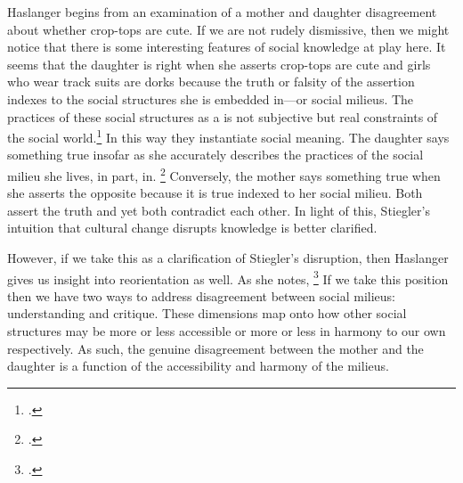\documentclass[letterpaper,notitlepage,12pt]{article}
\begin{document}
Haslanger begins from an examination of a mother and daughter disagreement about
whether crop-tops are cute.
If we are not rudely dismissive, then we might notice that there is some
interesting features of social knowledge at play here.
It seems that the daughter is right when she asserts crop-tops are cute and
girls who wear track suits are dorks because the truth or falsity of the
assertion indexes to the social structures she is embedded in---or social
milieus.
The practices of these social structures as a  is not subjective but real constraints of the social 
world.\footcite[p. 79]{haslanger_but_2007}
In this way they instantiate social meaning.
The daughter says something true insofar as she accurately describes the
practices of the social milieu she lives, in part, in.
\footcite[p. 81]{haslanger_but_2007}
Conversely, the mother says something true when she asserts the opposite because
it is true indexed to her social milieu.
Both assert the truth and yet both contradict each other.
In light of this, Stiegler's intuition that cultural change disrupts knowledge
is better clarified.

However, if we take this as a clarification of Stiegler's disruption, then
Haslanger gives us insight into reorientation as well.
As she notes, \footcite[p. 81]{haslanger_but_2007}
If we take this position then we have two ways to address disagreement between
social milieus: understanding and critique. These dimensions map onto how other
social structures may be more or less accessible or more or less in harmony to
our own respectively. As such, the genuine disagreement between the mother and
the daughter is a function of the accessibility and harmony of the milieus.
\end{document}
